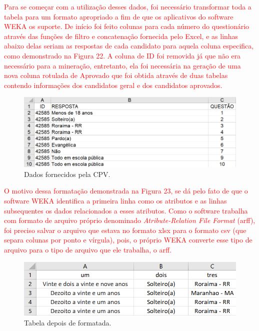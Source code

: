 \par
\textcolor{red}{Para se começar com a utilização desses dados, foi necessário transformar toda a tabela para um formato apropriado a fim de que os aplicativos do software WEKA os suporte. De início foi feito colunas para cada número do questionário através das funções de filtro e concatenação fornecida pelo Excel, e as linhas abaixo delas seriam as respostas de cada candidato para aquela coluna especifica, como demonstrado na Figura 22. A coluna de ID foi removida já que não era necessário para a mineração, entretanto, ela foi necessária na geração de uma nova coluna rotulada de Aprovado que foi obtida através de duas tabelas contendo informações dos candidatos geral e dos candidatos aprovados.}


\par
\begin{figure}[!htp]
	\begin{center}
    \caption{\label{fig:waveform_fig} Dados fornecidos pela CPV.}
	\includegraphics[scale=0.65]{Figuras/Formato_errado.png}
	\end{center}
\end{figure}

\par
\textcolor{red}{O motivo dessa formatação demonstrada na Figura 23, se dá pelo fato de que o software WEKA identifica a primeira linha como os atributos e as linhas subsequentes os dados relacionados a esses atributos. Como o software trabalha com formato de arquivo próprio denominado \textit{Atribute-Relation File Format} (arff), foi preciso salvar o arquivo que estava no formato xlsx para o formato csv (que separa colunas por ponto e vírgula), pois, o próprio WEKA converte esse tipo de arquivo para o tipo de arquivo que ele trabalha, o arff.}

\par
\begin{figure}[!htp]
	\begin{center}
    \caption{\label{fig:waveform_fig} Tabela depois de formatada.}
	\includegraphics[scale=0.65]{Figuras/Formato_certo.png}
	\end{center}
\end{figure}



